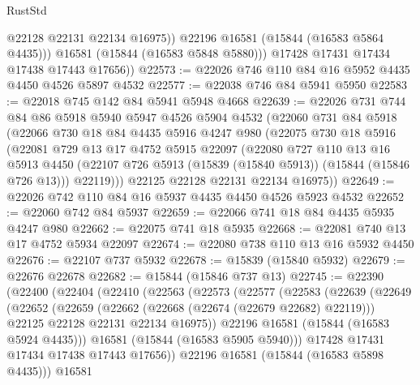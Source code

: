 \begin{lexlean}{RustStd}
\begin{coremodule}
                @22128
                @22131
                @22134
                @16975))
            @22196
            @16581
            (@15844 (@16583 @5864 @4435)))
          @16581
          (@15844 (@16583 @5848 @5880)))
        @17428
        @17431
        @17434
        @17438
        @17443
        @17656))
@22573 := @22026 @746 @110 @84 @16 @5952 @4435 @4450 @4526 @5897 @4532
@22577 := @22038 @746 @84 @5941 @5950
@22583 := @22018 @745 @142 @84 @5941 @5948 @4668
@22639 := @22026
    @731
    @744
    @84
    @86
    @5918
    @5940
    @5947
    @4526
    @5904
    @4532
    (@22060
      @731
      @84
      @5918
      (@22066
        @730
        @18
        @84
        @4435
        @5916
        @4247
        @980
        (@22075
          @730
          @18
          @5916
          (@22081
            @729
            @13
            @17
            @4752
            @5915
            @22097
            (@22080
              @727
              @110
              @13
              @16
              @5913
              @4450
              (@22107 @726 @5913 (@15839 (@15840 @5913)) (@15844 (@15846 @726 @13)))
              @22119)))
        @22125
        @22128
        @22131
        @22134
        @16975))
@22649 := @22026 @742 @110 @84 @16 @5937 @4435 @4450 @4526 @5923 @4532
@22652 := @22060 @742 @84 @5937
@22659 := @22066 @741 @18 @84 @4435 @5935 @4247 @980
@22662 := @22075 @741 @18 @5935
@22668 := @22081 @740 @13 @17 @4752 @5934 @22097
@22674 := @22080 @738 @110 @13 @16 @5932 @4450
@22676 := @22107 @737 @5932
@22678 := @15839 (@15840 @5932)
@22679 := @22676 @22678
@22682 := @15844 (@15846 @737 @13)
@22745 := @22390
    (@22400
      (@22404
        (@22410
          (@22563
            (@22573
              (@22577
                (@22583
                  (@22639
                    (@22649
                      (@22652
                        (@22659
                          (@22662 (@22668 (@22674 (@22679 @22682) @22119)))
                          @22125
                          @22128
                          @22131
                          @22134
                          @16975))
                      @22196
                      @16581
                      (@15844 (@16583 @5924 @4435)))
                    @16581
                    (@15844 (@16583 @5905 @5940)))
                  @17428
                  @17431
                  @17434
                  @17438
                  @17443
                  @17656))
              @22196
              @16581
              (@15844 (@16583 @5898 @4435)))
            @16581

\end{coremodule}
\end{lexlean}
